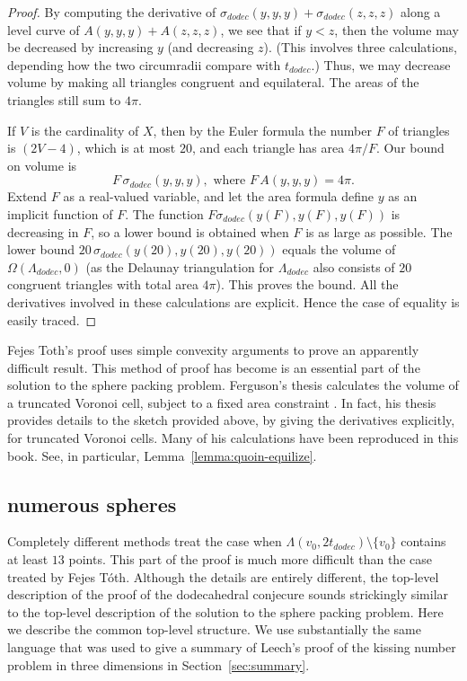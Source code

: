 \begin{proof}
By computing the derivative of $\sigma_{dodec}(y,y,y)+\sigma_{dodec}(z,z,z)$
along a level curve of $A(y,y,y)+A(z,z,z)$, we see that if $y<z$,
then the volume may be decreased by increasing $y$ (and decreasing $z$).
(This involves three calculations, depending how the two circumradii
compare with $t_{dodec}$.)  Thus, we may decrease volume by
making all triangles congruent and equilateral.  The areas of the
triangles still sum to $4\pi$.  

If $V$ is the cardinality
of $X$, then by the Euler formula the number $F$ 
of triangles is $(2V-4)$, which is at most $20$,
and each triangle has area $4\pi/F$.  Our bound on volume is
   $$
   F\, \sigma_{dodec}(y,y,y), \text { where } F\, A(y,y,y)=4\pi.
   $$
Extend $F$ as a real-valued variable, and
let the area formula define $y$ as an implicit function of $F$.
The function $F\sigma_{dodec}(y(F),y(F),y(F))$ 
is decreasing in $F$, so a lower bound is obtained
when $F$ is as large as possible.  The lower bound 
$20\,\sigma_{dodec}(y(20),y(20),y(20))$ equals the volume of
$\Omega(\Lambda_{dodec},0)$ (as the Delaunay triangulation
for $\Lambda_{dodec}$ also consists of $20$
congruent triangles with total area $4\pi$).  
This proves the bound. 
All the derivatives involved in these
calculations are explicit.  Hence the case of equality is easily
traced.
\end{proof}

Fejes Toth's proof uses simple convexity arguments to prove an
apparently difficult result.  This method of proof has become
 is an essential part of the solution to the sphere packing
problem.   Ferguson's thesis calculates the volume of a truncated
Voronoi cell, subject to a fixed area constraint 
\cite[sec.~16.9.5]{Fer97}.  In fact, his thesis provides details
to the sketch provided above, by giving the derivatives explicitly,
for truncated Voronoi cells.  Many of his calculations have been
reproduced in this book.  See, in particular, 
Lemma~\ref{lemma:quoin-equilize}.


\subsection{numerous spheres}

Completely different methods treat the case when $\Lambda(v_0,2t_{dodec})\setminus\{v_0\}$ contains at least $13$ points.  This part of the proof is
much more difficult than the case treated by Fejes T\'oth.
Although the details are
entirely different, the top-level description of the proof of the
dodecahedral conjecure sounds strickingly similar to the top-level
description of the solution to the sphere packing problem.  Here
we describe the common top-level structure.  We use substantially
the same language that was used to give a summary of Leech's proof
of the kissing number problem in three dimensions in Section~\ref{sec:summary}.

